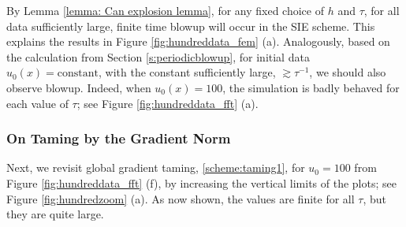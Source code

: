 \documentclass[reqno, 11pt]{amsart}
\theoremstyle{plain}
\theoremstyle{definition}
\theoremstyle{remark}
\numberwithin{equation}{section}
\numberwithin{theorem}{section}
\newcommand{\E}{\mathbb{E}}
\begin{document}
{By Lemma \ref{lemma: Can explosion lemma},  for any fixed choice of $h$ and $\tau$, for all data sufficiently large, finite time blowup will occur in the SIE scheme.  This explains the results in Figure \ref{fig:hundreddata_fem} (a).  Analogously, based on the calculation from Section \ref{s:periodicblowup}, for initial data $u_0(x) = \text{constant}$, with the constant sufficiently large, $\gtrsim \tau^{-1}$, we should also observe blowup. Indeed, when $u_0(x) = 100$, the simulation is badly behaved for each value of $\tau$; see Figure \ref{fig:hundreddata_fft} (a).



\subsubsection{On Taming by the Gradient Norm}
Next, we revisit global gradient taming, \eqref{scheme:taming1}, for $u_0 = 100$ from Figure \ref{fig:hundreddata_fft} (f), by increasing the vertical limits of the plots; see Figure \ref{fig:hundredzoom} (a).  As now shown, the values are finite for all $\tau$, but they are quite large. 


}
\end{document}
